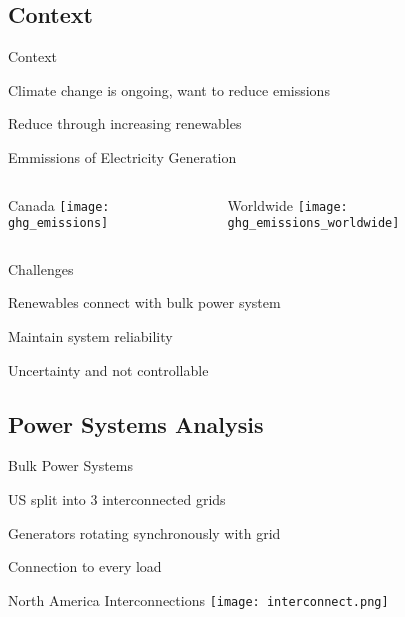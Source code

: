 \subsection{Context}
\begin{frame}{Context}
\bi
\item Climate change is ongoing, want to reduce emissions
\item Reduce through increasing renewables
\ei

\pause
\centering
\vspace{.2in}
\alert{Emmissions of Electricity Generation}
\vspace{.2in}
\begin{columns}
\begin{column}{0.425\textwidth}
\centering
Canada
\texttt{[image: ghg\_emissions]}
\end{column}
\begin{column}{0.425\textwidth}
\centering
Worldwide
\texttt{[image: ghg\_emissions\_worldwide]}
\end{column}
\end{columns}
\end{frame}
\begin{frame}{Challenges}
\bi
\item Renewables connect with bulk power system
\item Maintain system reliability
\item Uncertainty and not controllable
\ei
\end{frame}

\subsection{Power Systems Analysis}
\begin{frame}{Bulk Power Systems}

US split into 3 interconnected grids
\bi
\item Generators rotating synchronously with grid
\item Connection to every load
\ei

\end{frame}

\begin{frame}{North America Interconnections}
\centering
\texttt{[image: interconnect.png]}
\end{frame}

